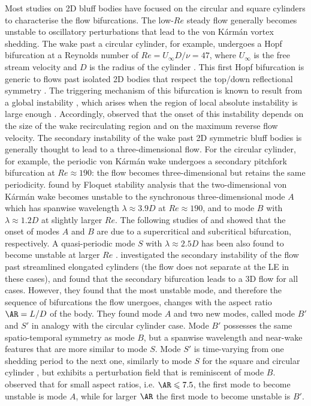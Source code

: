\documentclass{jfm}
\begin{document}
Most studies on 2D bluff bodies have focused on the circular and square cylinders to characterise the flow bifurcations. The low-$Re$ steady flow generally becomes unstable to oscillatory perturbations that lead to the von K\'{a}rm\'{a}n vortex shedding. The wake past a circular cylinder, for example, undergoes a Hopf bifurcation at a Reynolds number of $Re = U_\infty D /\nu = 47$, where $U_\infty$ is the free stream velocity and $D$ is the radius of the cylinder \cite{noack.eckelmann-1994-globalstability}. This first Hopf bifurcation is generic to flows past isolated 2D bodies that respect the top/down reflectional symmetry \citep{jackson-1987-finiteelementstudy,chiarini-quadrio-auteri-2022b}. The triggering mechanism of this bifurcation is known to result from a global instability \citep{jackson-1987-finiteelementstudy}, which arises when the region of local absolute instability is large enough \citep{chomaz-2005}. Accordingly, \cite{chiarini-quadrio-auteri-2022b} observed that the onset of this instability depends on the size of the wake recirculating region and on the maximum reverse flow velocity.
%
The secondary instability of the wake past 2D symmetric bluff bodies is generally thought to lead to a three-dimensional flow. For the circular cylinder, for example, the periodic von K\'{a}rm\'{a}n wake undergoes a secondary pitchfork bifurcation at $Re \approx 190$: the flow becomes three-dimensional but retains the same periodicity. \cite{barkley-henderson-1996} found by Floquet stability analysis that the two-dimensional von K\'{a}rm\'{a}n wake becomes unstable to the synchronous three-dimensional mode $A$ which has spanwise wavelength $\lambda \approx 3.9 D$ at $Re \approx 190$, and to mode $B$ with $\lambda \approx 1.2 D$ at slightly larger $Re$. The following studies of \cite{henderson-barkley-1996} and \cite{henderson-1997} showed that the onset of modes $A$ and $B$ are due to a supercritical and subcritical bifurcation, respectively. A quasi-periodic mode $S$ with $\lambda \approx 2.5D$ has been also found to become unstable at larger $Re$ \citep{blackburn-lopez-2003,blackburn-etal-2005,blackburn-sheard-2010}. 
%
\cite{ryan-thompson-hourigan-2005} investigated the secondary instability of the flow past streamlined elongated cylinders (the flow does not separate at the LE in these cases), and found that the secondary bifurcation leads to a 3D flow for all cases. However, they found that the most unstable mode, and therefore the sequence of bifurcations the flow unergoes, changes with the aspect ratio $\AR=L/D$ of the body. They found mode $A$ and two new modes, called mode $B'$ and $S'$ in analogy with the circular cylinder case. Mode $B'$ possesses the same spatio-temporal symmetry as mode $B$, but a spanwise wavelength and near-wake features that are more similar to mode $S$. Mode $S'$ is time-varying from one shedding period to the next one, similarly to mode $S$ for the square and circular cylinder \citep{robichaux-balachandar-vanka-1999}, but exhibits a perturbation field that is reminiscent of mode $B$. \cite{ryan-thompson-hourigan-2005} observed that for small aspect ratios, i.e. $\AR \le 7.5$, the first mode to become unstable is mode $A$, while for larger $\AR$ the first mode to become unstable is $B'$. 
\end{document}
